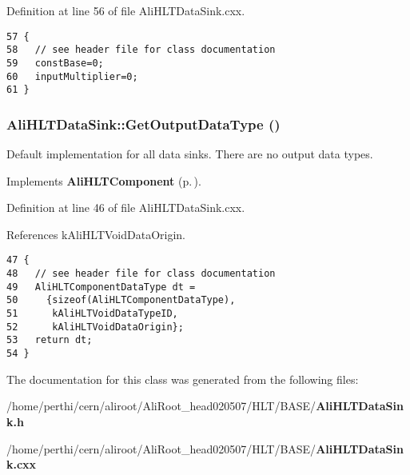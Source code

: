 Definition at line 56 of file Ali\-HLTData\-Sink.cxx.

\footnotesize\begin{verbatim}57 {
58   // see header file for class documentation
59   constBase=0;
60   inputMultiplier=0;
61 }
\end{verbatim}\normalsize 


\subsubsection{ Ali\-HLTData\-Sink::Get\-Output\-Data\-Type ()\hspace{0.3cm}{\tt  [virtual]}}\label{classAliHLTDataSink_a4}


Default implementation for all data sinks. There are no output data types. 

Implements {\bf Ali\-HLTComponent} {\rm (p.\,\pageref{classAliHLTComponent_a11})}.

Definition at line 46 of file Ali\-HLTData\-Sink.cxx.

References k\-Ali\-HLTVoid\-Data\-Origin.

\footnotesize\begin{verbatim}47 {
48   // see header file for class documentation
49   AliHLTComponentDataType dt =
50     {sizeof(AliHLTComponentDataType),
51      kAliHLTVoidDataTypeID,
52      kAliHLTVoidDataOrigin};
53   return dt;
54 }
\end{verbatim}\normalsize 




The documentation for this class was generated from the following files:\begin{CompactItemize}
\item 
/home/perthi/cern/aliroot/Ali\-Root\_\-head020507/HLT/BASE/{\bf Ali\-HLTData\-Sink.h}\item 
/home/perthi/cern/aliroot/Ali\-Root\_\-head020507/HLT/BASE/{\bf Ali\-HLTData\-Sink.cxx}\end{CompactItemize}
